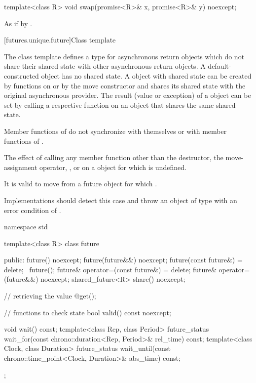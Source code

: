 %
\begin{itemdecl}
template<class R>
  void swap(promise<R>& x, promise<R>& y) noexcept;
\end{itemdecl}

\begin{itemdescr}
\pnum
\effects
As if by .
\end{itemdescr}

[futures.unique.future]{Class template }

\pnum
The class template  defines a type for asynchronous return objects which
do not share their shared state with other asynchronous return objects.
A default-constructed  object has no
shared state. A  object with shared state can be created by
functions on 
or by the move constructor and shares its shared state with
the original asynchronous provider. The result (value or exception) of
a  object
can be
set by
calling a respective function on an
object that shares the same
shared state.

\pnum
\begin{note}
Member functions of  do not synchronize with themselves or with
member functions of .
\end{note}

\pnum
The effect of calling any member function other than the destructor, the
move-assignment operator, , or  on a  object for which
is undefined.
\begin{note}
It is valid to move from a future object for which .
\end{note}

\recommended
Implementations should detect this case and throw an object of type
 with an error condition of .

%
\begin{codeblock}
namespace std {
  template<class R>
  class future {
  public:
    future() noexcept;
    future(future&&) noexcept;
    future(const future&) = delete;
    ~future();
    future& operator=(const future&) = delete;
    future& operator=(future&&) noexcept;
    shared_future<R> share() noexcept;

    // retrieving the value
    @\seebelow@ get();

    // functions to check state
    bool valid() const noexcept;

    void wait() const;
    template<class Rep, class Period>
      future_status wait_for(const chrono::duration<Rep, Period>& rel_time) const;
    template<class Clock, class Duration>
      future_status wait_until(const chrono::time_point<Clock, Duration>& abs_time) const;
  };
}
\end{codeblock}

